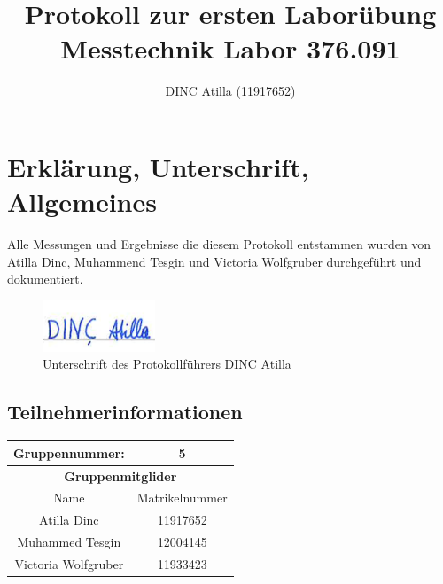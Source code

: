 \documentclass[a4paper]{article}
\title{Protokoll zur ersten Laborübung\\Messtechnik Labor 376.091}
\author{DINC Atilla (11917652)}
\begin{document}
\newcommand{\unit}[1]{\ensuremath{\, \mathrm{#1}}} %
\pagestyle{fancy}
\fancyfoot[C]{\textbf{\thepage /\pageref{LastPage}}}
\renewcommand{\footrulewidth}{0.4pt}

\normalsize
\maketitle
\tableofcontents
\pagebreak
\section{Erklärung, Unterschrift, Allgemeines}
Alle Messungen und Ergebnisse die diesem Protokoll entstammen wurden von Atilla Dinc,
Muhammend Tesgin und Victoria Wolfgruber durchgeführt und dokumentiert.

\begin{figure}[h]
    \centering
    \includegraphics[width=0.3\textwidth]{images/Unterschrift}
    \caption{Unterschrift des Protokollführers DINC Atilla}
\end{figure}

\subsection{Teilnehmerinformationen}
	\begin{tabular}{|c| c|}
		\hline
        \textbf{Gruppennummer:} & 5                                                                                        \\
        \hline
		\multicolumn{2}{|c|}{\textbf{Gruppenmitglider}}                                                                                        \\
		\hline
        Name & Matrikelnummer\\
        \hline
        Atilla Dinc & 11917652\\
        Muhammed Tesgin & 12004145\\
        Victoria Wolfgruber & 11933423\\
        \hline
	\end{tabular}
\end{document}
